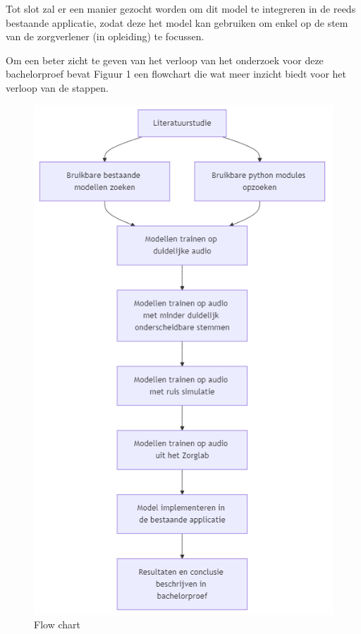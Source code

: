 Tot slot zal er een manier gezocht worden om dit model te integreren in de reeds bestaande applicatie, zodat deze het model kan gebruiken om enkel op de stem van de zorgverlener (in opleiding) te focussen.

Om een beter zicht te geven van het verloop van het onderzoek voor deze bachelorproef bevat Figuur 1 een flowchart die wat meer inzicht biedt voor het verloop van de stappen.

\begin{figure}
	\centering
	\includegraphics[width=\columnwidth]{img/flowchart.png}
	\caption{Flow chart}
\end{figure}

